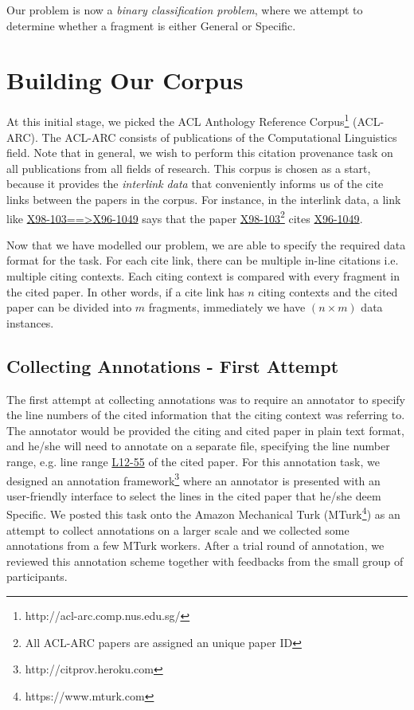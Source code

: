 Our problem is now a \textit{binary classification problem}, where we attempt to determine whether a fragment is either General or Specific.

\section{Building Our Corpus}
\label{buildingcorpus}
At this initial stage, we picked the ACL Anthology Reference Corpus\footnote{http://acl-arc.comp.nus.edu.sg/} (ACL-ARC). The ACL-ARC consists of publications of the Computational Linguistics field. Note that in general, we wish to perform this citation provenance task on all publications from all fields of research. This corpus is chosen as a start, because it provides the \textit{interlink data} that conveniently informs us of the cite links between the papers in the corpus. For instance, in the interlink data, a link like \url{X98-103==>X96-1049} says that the paper \url{X98-103}\footnote{All ACL-ARC papers are assigned an unique paper ID} cites \url{X96-1049}.

Now that we have modelled our problem, we are able to specify the required data format for the task. For each cite link, there can be multiple in-line citations i.e. multiple citing contexts. Each citing context is compared with every fragment in the cited paper. In other words, if a cite link has $n$ citing contexts and the cited paper can be divided into $m$ fragments, immediately we have $(n \times m)$ data instances.

\subsection*{Collecting Annotations - First Attempt}
The first attempt at collecting annotations was to require an annotator to specify the line numbers of the cited information that the citing context was referring to. The annotator would be provided the citing and cited paper in plain text format, and he/she will need to annotate on a separate file, specifying the line number range, e.g. line range \url{L12-55} of the cited paper. For this annotation task, we designed an annotation framework\footnote{http://citprov.heroku.com} where an annotator is presented with an user-friendly interface to select the lines in the cited paper that he/she deem Specific. We posted this task onto the Amazon Mechanical Turk (MTurk\footnote{https://www.mturk.com}) as an attempt to collect annotations on a larger scale and we collected some annotations from a few MTurk workers. After a trial round of annotation, we reviewed this annotation scheme together with feedbacks from the small group of participants.

